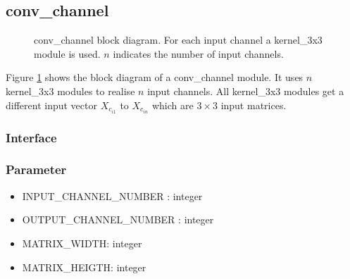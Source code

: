 \subsection{conv\_channel}

\begin{figure}[h]
	\centering
	
	\caption[conv\_channel block diagram.]{conv\_channel block diagram. For each input channel a kernel\_3x3 module is used. $n$ indicates the number of input channels.}
	\label{FIG:conv-channel}
\end{figure}
Figure \ref{FIG:conv-channel} shows the block diagram of a conv\_channel module. It uses $n$ kernel\_3x3 modules to realise $n$ input channels. 
All kernel\_3x3 modules get a different input vector $X_{c_{i1}}$ to $X_{c_{in}}$ which are $3 \times 3$ input matrices.   
\subsubsection{Interface}

\subsubsection{Parameter}
\begin{itemize}
 	\item INPUT\_CHANNEL\_NUMBER : integer
 	\item OUTPUT\_CHANNEL\_NUMBER : integer
 	\item MATRIX\_WIDTH: integer
 	\item MATRIX\_HEIGTH: integer
\end{itemize}